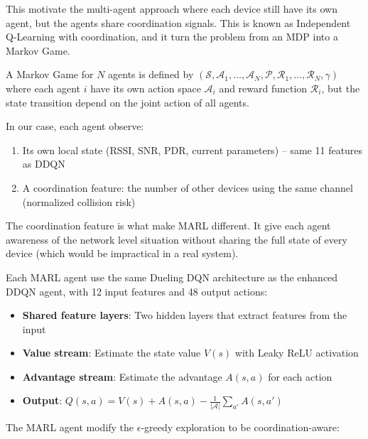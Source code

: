 \documentclass[12pt,a4paper]{article}
\begin{document}
This motivate the multi-agent approach where each device still have its own agent, but the agents share coordination signals. This is known as Independent Q-Learning with coordination, and it turn the problem from an MDP into a Markov Game.


A Markov Game for $N$ agents is defined by $(\mathcal{S}, \mathcal{A}_1, \ldots, \mathcal{A}_N, \mathcal{P}, \mathcal{R}_1, \ldots, \mathcal{R}_N, \gamma)$ where each agent $i$ have its own action space $\mathcal{A}_i$ and reward function $\mathcal{R}_i$, but the state transition depend on the joint action of all agents.

In our case, each agent observe:
\begin{enumerate}
    \item Its own local state (RSSI, SNR, PDR, current parameters) -- same 11 features as DDQN
    \item A coordination feature: the number of other devices using the same channel (normalized collision risk)
\end{enumerate}

The coordination feature is what make MARL different. It give each agent awareness of the network level situation without sharing the full state of every device (which would be impractical in a real system).


Each MARL agent use the same Dueling DQN architecture as the enhanced DDQN agent, with 12 input features and 48 output actions:

\begin{itemize}
    \item \textbf{Shared feature layers}: Two hidden layers that extract features from the input
    \item \textbf{Value stream}: Estimate the state value $V(s)$ with Leaky ReLU activation
    \item \textbf{Advantage stream}: Estimate the advantage $A(s, a)$ for each action
    \item \textbf{Output}: $Q(s, a) = V(s) + A(s, a) - \frac{1}{|\mathcal{A}|}\sum_{a'} A(s, a')$
\end{itemize}


The MARL agent modify the $\epsilon$-greedy exploration to be coordination-aware:
\end{document}
